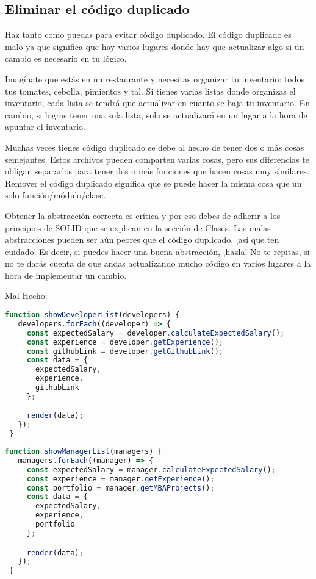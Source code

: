 \subsection*{Eliminar el código duplicado}

Haz tanto como puedas para evitar código duplicado. El código duplicado es malo ya que significa que hay varios lugares donde hay que actualizar algo si un cambio es necesario en tu lógico.

Imagínate que estás en un restaurante y necesitas organizar tu inventario: todos tus tomates, cebolla, pimientos y tal. Si tienes varias listas donde organizas el inventario, cada lista se tendrá que actualizar en cuanto se baja tu inventario. En cambio, si logras tener una sola lista, solo se actualizará en un lugar a la hora de apuntar el inventario.

Muchas veces tienes código duplicado se debe al hecho de tener dos o más cosas semejantes. Estos archivos pueden comparten varias cosas, pero sus diferencias te obligan separarlos para tener dos o más funciones que hacen cosas muy similares. Remover el código duplicado significa que se puede hacer la misma cosa que un solo función/módulo/clase.

Obtener la abstracción correcta es crítica y por eso debes de adherir a los principios de SOLID que se explican en la sección de Clases. Las malas abstracciones pueden ser aún peores que el código duplicado, ¡así que ten cuidado! Es decir, si puedes hacer una buena abstracción, ¡hazla! No te repitas, si no te darás cuenta de que andas actualizando mucho código en varios lugares a la hora de implementar un cambio.

Mal Hecho:
\begin{lstlisting}[language=TypeScript, style=badstyle]
 function showDeveloperList(developers) {
   developers.forEach((developer) => {
     const expectedSalary = developer.calculateExpectedSalary();
     const experience = developer.getExperience();
     const githubLink = developer.getGithubLink();
     const data = {
       expectedSalary,
       experience,
       githubLink
     };

     render(data);
   });
 }
\end{lstlisting}
\newpage

\begin{lstlisting}[language=TypeScript, style=badstyle]
 function showManagerList(managers) {
   managers.forEach((manager) => {
     const expectedSalary = manager.calculateExpectedSalary();
     const experience = manager.getExperience();
     const portfolio = manager.getMBAProjects();
     const data = {
       expectedSalary,
       experience,
       portfolio
     };

     render(data);
   });
 }
\end{lstlisting}
\vspace{0.5cm} %

